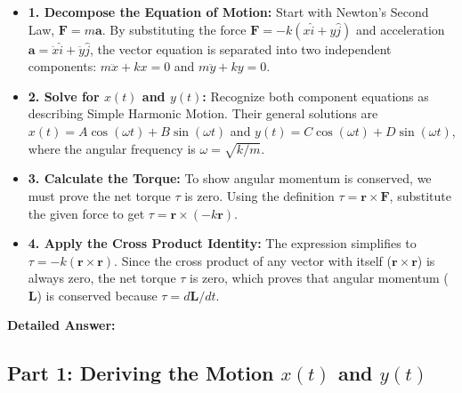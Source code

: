 \documentclass[11pt, a4paper]{article} %
\begin{document}
\begin{itemize}
    \item \textbf{1. Decompose the Equation of Motion:}
    Start with Newton's Second Law, $\mathbf{F} = m\mathbf{a}$. By substituting the force $\mathbf{F} = -k(x\hat{i} + y\hat{j})$ and acceleration $\mathbf{a} = \ddot{x}\hat{i} + \ddot{y}\hat{j}$, the vector equation is separated into two independent components: $m\ddot{x} + kx = 0$ and $m\ddot{y} + ky = 0$.

    \item \textbf{2. Solve for $x(t)$ and $y(t)$:}
    Recognize both component equations as describing Simple Harmonic Motion. Their general solutions are $x(t) = A \cos(\omega t) + B \sin(\omega t)$ and $y(t) = C \cos(\omega t) + D \sin(\omega t)$, where the angular frequency is $\omega = \sqrt{k/m}$.

    \item \textbf{3. Calculate the Torque:}
    To show angular momentum is conserved, we must prove the net torque $\tau$ is zero. Using the definition $\tau = \mathbf{r} \times \mathbf{F}$, substitute the given force to get $\tau = \mathbf{r} \times (-k\mathbf{r})$.

    \item \textbf{4. Apply the Cross Product Identity:}
    The expression simplifies to $\tau = -k(\mathbf{r} \times \mathbf{r})$. Since the cross product of any vector with itself ($\mathbf{r} \times \mathbf{r}$) is always zero, the net torque $\tau$ is zero, which proves that angular momentum ($\mathbf{L}$) is conserved because $\tau = d\mathbf{L}/dt$.
\end{itemize}

\hrulefill

\textbf{Detailed Answer:}

\subsection*{Part 1: Deriving the Motion $x(t)$ and $y(t)$}
\end{document}
